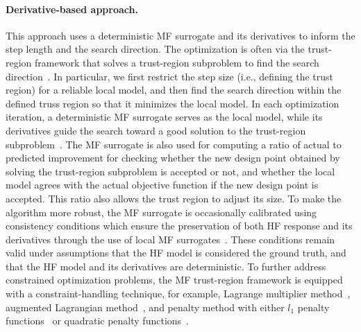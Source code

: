 \documentclass[journal ]{new-aiaa}
\begin{document}
\paragraph{Derivative-based approach.}
This approach uses a deterministic MF surrogate and its derivatives to inform the step length and the search direction. 
The optimization is often via the trust-region framework that solves a trust-region subproblem to find the search direction~\citep{Nocedal2006}.
In particular, we first restrict the step size (i.e., defining the trust region) for a reliable local model, and then find the search direction within the defined truss region so that it minimizes the local model.
In each optimization iteration, a deterministic MF surrogate serves as the local model, while its derivatives guide the search toward a good solution to the trust-region subproblem~\citep{Alexandrov1998,Alexandrov2001,Robinson2008}.
The MF surrogate is also used for computing a ratio of actual to predicted improvement for checking whether the new design point obtained by solving the trust-region subproblem is accepted or not, and whether the local model agrees with the actual objective function if the new design point is accepted.
This ratio also allows the trust region to adjust its size.
To make the algorithm more robust, the MF surrogate is occasionally
calibrated using consistency conditions which ensure the preservation of both HF response and its derivatives through the use of local MF surrogates~\citep{Alexandrov1998,Alexandrov2001}.
These conditions remain valid under assumptions that the HF model is considered the ground truth, and that the HF model and its derivatives are deterministic.
To further address constrained optimization problems, the MF trust-region framework is equipped with a constraint-handling technique, for example, Lagrange multiplier method~\citep{Robinson2008,March2011}, augmented Lagrangian method~\citep{Alexandrov2001}, and penalty method with either $l_1$ penalty functions~\citep{Alexandrov2001,Gano2005} or quadratic penalty functions~\citep{Elham2015}.
\end{document}
